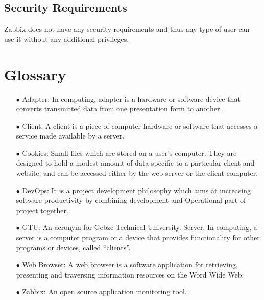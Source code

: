 \documentclass{article}
\begin{document}
\subsection{Security Requirements}
Zabbix does not have any security requirements and thus any type of user can use it without any additional privileges.

\appendix
\section{Glossary}
\begin{itemize}
\item[$\bullet$]Adapter: In computing, adapter is a hardware or software device that converts transmitted data from one presentation form to another.
\item[$\bullet$] Client: A client is a piece of computer hardware or software that accesses a service made available by a server.
\item[$\bullet$] Cookies: Small files which are stored on a user's computer. They are  designed to hold a modest amount of data specific to a particular client and website, and can be accessed either by the web server or the client computer.
\item[$\bullet$] DevOps: It is a project development philosophy which aims at increasing software         
            productivity by combining development and Operational part of project  together.
\item[$\bullet$]GTU: An acronym for Gebze Technical University.
Server: In computing, a server is a computer program or a device that provides functionality for other programs or devices, called “clients”.
\item[$\bullet$] Web Browser: A web browser is a software application for retrieving, presenting and traversing information resources on the Word Wide Web.
\item[$\bullet$] Zabbix: An open source application monitoring tool.
\end{itemize}
\end{document}
